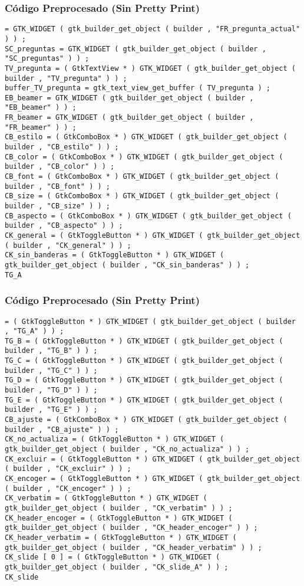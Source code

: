 \documentclass{beamer}
\begin{document}
\begin{frame}[fragile]
\frametitle{C\'odigo Preprocesado (Sin Pretty Print)}
\begin{lstlisting}[style=CStyle]
= GTK_WIDGET ( gtk_builder_get_object ( builder , "FR_pregunta_actual" ) ) ; 
SC_preguntas = GTK_WIDGET ( gtk_builder_get_object ( builder , "SC_preguntas" ) ) ; 
TV_pregunta = ( GtkTextView * ) GTK_WIDGET ( gtk_builder_get_object ( builder , "TV_pregunta" ) ) ; 
buffer_TV_pregunta = gtk_text_view_get_buffer ( TV_pregunta ) ; 
EB_beamer = GTK_WIDGET ( gtk_builder_get_object ( builder , "EB_beamer" ) ) ; 
FR_beamer = GTK_WIDGET ( gtk_builder_get_object ( builder , "FR_beamer" ) ) ; 
CB_estilo = ( GtkComboBox * ) GTK_WIDGET ( gtk_builder_get_object ( builder , "CB_estilo" ) ) ; 
CB_color = ( GtkComboBox * ) GTK_WIDGET ( gtk_builder_get_object ( builder , "CB_color" ) ) ; 
CB_font = ( GtkComboBox * ) GTK_WIDGET ( gtk_builder_get_object ( builder , "CB_font" ) ) ; 
CB_size = ( GtkComboBox * ) GTK_WIDGET ( gtk_builder_get_object ( builder , "CB_size" ) ) ; 
CB_aspecto = ( GtkComboBox * ) GTK_WIDGET ( gtk_builder_get_object ( builder , "CB_aspecto" ) ) ; 
CK_general = ( GtkToggleButton * ) GTK_WIDGET ( gtk_builder_get_object ( builder , "CK_general" ) ) ; 
CK_sin_banderas = ( GtkToggleButton * ) GTK_WIDGET ( gtk_builder_get_object ( builder , "CK_sin_banderas" ) ) ; 
TG_A \end{lstlisting}
\end{frame}
\begin{frame}[fragile]
\frametitle{C\'odigo Preprocesado (Sin Pretty Print)}
\begin{lstlisting}[style=CStyle]
= ( GtkToggleButton * ) GTK_WIDGET ( gtk_builder_get_object ( builder , "TG_A" ) ) ; 
TG_B = ( GtkToggleButton * ) GTK_WIDGET ( gtk_builder_get_object ( builder , "TG_B" ) ) ; 
TG_C = ( GtkToggleButton * ) GTK_WIDGET ( gtk_builder_get_object ( builder , "TG_C" ) ) ; 
TG_D = ( GtkToggleButton * ) GTK_WIDGET ( gtk_builder_get_object ( builder , "TG_D" ) ) ; 
TG_E = ( GtkToggleButton * ) GTK_WIDGET ( gtk_builder_get_object ( builder , "TG_E" ) ) ; 
CB_ajuste = ( GtkComboBox * ) GTK_WIDGET ( gtk_builder_get_object ( builder , "CB_ajuste" ) ) ; 
CK_no_actualiza = ( GtkToggleButton * ) GTK_WIDGET ( gtk_builder_get_object ( builder , "CK_no_actualiza" ) ) ; 
CK_excluir = ( GtkToggleButton * ) GTK_WIDGET ( gtk_builder_get_object ( builder , "CK_excluir" ) ) ; 
CK_encoger = ( GtkToggleButton * ) GTK_WIDGET ( gtk_builder_get_object ( builder , "CK_encoger" ) ) ; 
CK_verbatim = ( GtkToggleButton * ) GTK_WIDGET ( gtk_builder_get_object ( builder , "CK_verbatim" ) ) ; 
CK_header_encoger = ( GtkToggleButton * ) GTK_WIDGET ( gtk_builder_get_object ( builder , "CK_header_encoger" ) ) ; 
CK_header_verbatim = ( GtkToggleButton * ) GTK_WIDGET ( gtk_builder_get_object ( builder , "CK_header_verbatim" ) ) ; 
CK_slide [ 0 ] = ( GtkToggleButton * ) GTK_WIDGET ( gtk_builder_get_object ( builder , "CK_slide_A" ) ) ; 
CK_slide \end{lstlisting}
\end{frame}
\end{document}
